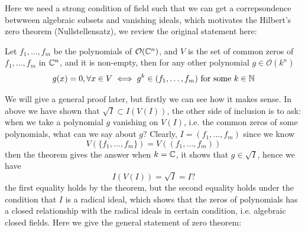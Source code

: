 Here we need a strong condition of field such that we can get a correpsondence betwween algebraic subsets and vanishing ideals, which motivates the Hilbert's zero theorem (Nullstellensatz), we review the original statement here:
\begin{theorem}[1893]
    Let \(f_1,...,f_m\) be the polynomials of \(\mathcal{O}(\mathbb{C}^n)\), and \(V\) is the set of common zeros of \(f_1,...,f_m\) in \(\mathbb{C}^n\), and it is non-empty, then for any other polynomial \(g \in \mathcal{O}(k^n)\)
    \[g(x) = 0, \forall x \in V \iff g^k \in (f_1,\dots,f_m) \text{ for some } k \in \mathbb{N}\]
\end{theorem}
We will give a general proof later, but firstly we can see how it makes sense. In above we have shown that \(\sqrt{I} \subset I(V(I))\), the other side of inclusion is to ask: when we take a polynomial \(g\) vanishing on \(V(I)\), i.e. the common zeros of some polynomials, what can we say about \(g\)? Clearly, \(I = (f_1,\dots,f_m)\) since we know 
\[V(\{f_1,\dots,f_m\}) = V((f_1,\dots,f_m))\]
then the theorem gives the answer when \(k = \mathbb{C}\), it shows that \(g \in \sqrt{I}\), hence we have
\[I(V(I)) = \sqrt{I} = I ?\]
the first equality holds by the theorem, but the second equality holds under the condition that \(I\) is a radical ideal, which shows that the zeros of polynomials has a closed relationship with the radical ideals in certain condition, i.e. algebraic closed fields. Here we give the general statement of zero theorem:

